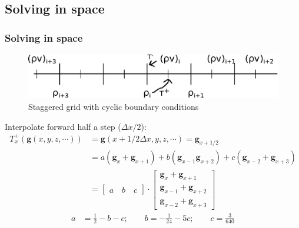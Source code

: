 \documentclass{beamer}
\begin{document}
\subsection{Solving in space}
\begin{frame}[shrink=20]
\frametitle{Solving in space}
\begin{figure}[htbp]
    \centering
    \includegraphics[width=\columnwidth]{staggered.eps}
    \caption{Staggered grid with cyclic boundary conditions}
    \label{fig:staggered}
\end{figure}

Interpolate forward half a step ($\Delta x/2$):
\begin{align}
    T^+_x(\mathbf{g}(x, y, z, \cdots)) &=  \mathbf{g}(x+1/2 \Delta x, y, z, \cdots) = \mathbf{g}_{x+1/2} \\
    &= a(\mathbf{g}_{x} + \mathbf{g}_{x+1}) + b\left( \mathbf{g}_{x-1} \mathbf{g}_{x+2} \right) + c \left( \mathbf{g}_{x-2} + \mathbf{g}_{x+3} \right) \\
    & = 
    \begin{bmatrix}
        a \quad b \quad c
    \end{bmatrix}
    \cdot
    \begin{bmatrix}
        \mathbf{g}_x + \mathbf{g}_{x+1} \\
        \mathbf{g}_{x-1} + \mathbf{g}_{x+2} \\
        \mathbf{g}_{x-2} + \mathbf{g}_{x+3}
    \end{bmatrix}
    \label{eq:interp}
\end{align}
\begin{align*}
    a &= \frac{1}{2} - b - c; \qquad b = -\frac{1}{24} - 5c; \qquad c = \frac{3}{640} 
\end{align*}

    
\end{frame}
\end{document}
